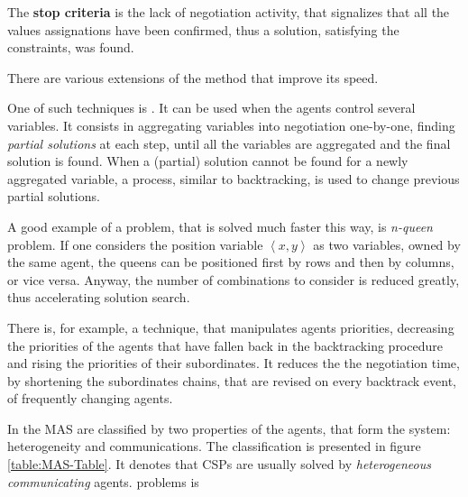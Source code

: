 \documentclass[ThesisDoc]{subfiles}
\begin{document}
The \textbf{stop criteria} is the lack of negotiation activity, that signalizes
that all the values assignations have been confirmed, thus a solution, satisfying
the constraints, was found.

\bigskip

\noindent
There are various extensions of the method that improve its speed.

One of such techniques is .
It can be used when the agents control several variables. It consists in
aggregating variables into negotiation one-by-one, finding \emph{partial solutions}
at each step, until all the variables are aggregated and the final solution
is found. When a (partial) solution cannot be found for a newly aggregated
variable, a process, similar to backtracking, is used to change previous
partial solutions.

A good example of a problem, that is solved much faster this way, is
\emph{n-queen} problem. If one considers the position variable
$\left< x,y \right>$ as two variables, owned by the same agent, the queens
can be positioned first by rows and then by columns, or vice versa. Anyway,
the number of combinations to consider is reduced greatly, thus accelerating
solution search.

There is, for example, a technique, that manipulates agents priorities,
decreasing the priorities of the agents that have fallen back in the backtracking
procedure and rising the priorities of their subordinates. It reduces the
the negotiation time, by shortening the subordinates chains, that are
revised on every backtrack event, of frequently changing agents.

\bigskip

\noindent
In \cite{MAS-Survey} the MAS are classified by two properties of the agents,
that form the system: heterogeneity and communications.
The classification is presented in figure \ref{table:MAS-Table}. It denotes
that CSPs are usually solved by \emph{heterogeneous communicating} agents.
problems is
\end{document}
